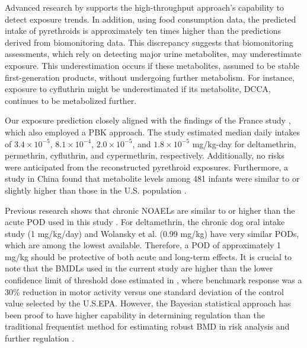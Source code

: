 \documentclass[toxics,article,submit,pdftex,moreauthors]{Definitions/mdpi}
\begin{document}
Advanced research by \citet{stanfield2024characterizing} supports the
high-throughput approach's capability to detect exposure trends. In
addition, using food consumption data, the predicted intake of
pyrethroids is approximately ten times higher than the predictions
derived from biomonitoring data. This discrepancy suggests that
biomonitoring assessments, which rely on detecting major urine
metabolites, may underestimate exposure. This underestimation occurs if
these metabolites, assumed to be stable first-generation products,
without undergoing further metabolism. For instance, exposure to
cyfluthrin might be underestimated if its metabolite, DCCA, continues to
be metabolized further.

Our exposure prediction closely aligned with the findings of the France study
\citep{quindroit2021estimating}, which also employed a PBK approach. 
The study estimated median daily intakes of \(3.4 \times 10^{-5}\), \(8.1 \times
10^{-4}\), \(2.0 \times 10^{-5}\), and \(1.8 \times 10^{-5}\) mg/kg-day for
deltamethrin, permethrin, cyfluthrin, and cypermethrin, respectively.
Additionally, no risks were anticipated from the reconstructed pyrethroid
exposures. Furthermore, a study in China found that metabolite levels among 481
infants were similar to or slightly higher than those in the U.S. population
\citep{wu2013urinary}.

Previous research shows that chronic NOAELs are similar to or higher than the
acute POD used in this study \citep{us2017deltamethrin}. For deltamethrin, the
chronic dog oral intake study (1 mg/kg/day) and Wolansky et al.
\citep{wolansky_relative_2006} (0.99 mg/kg) have very similar PODs, which are
among the lowest available. Therefore, a POD of approximately 1 mg/kg should be
protective of both acute and long-term effects. It is crucial to note that the
BMDLs used in the current study are higher than the lower confidence limit of
threshold dose estimated in \citep{wolansky_relative_2006}, where benchmark
response was a 30\% reduction in motor activity versus one standard deviation
of the control value selected by the U.S.EPA. However, the Bayesian statistical
approach has been proof to have higher capability in determining regulation
than the traditional frequentist method for estimating robust BMD in risk
analysis and further regulation \citep{desai_role_2024}.
\end{document}

